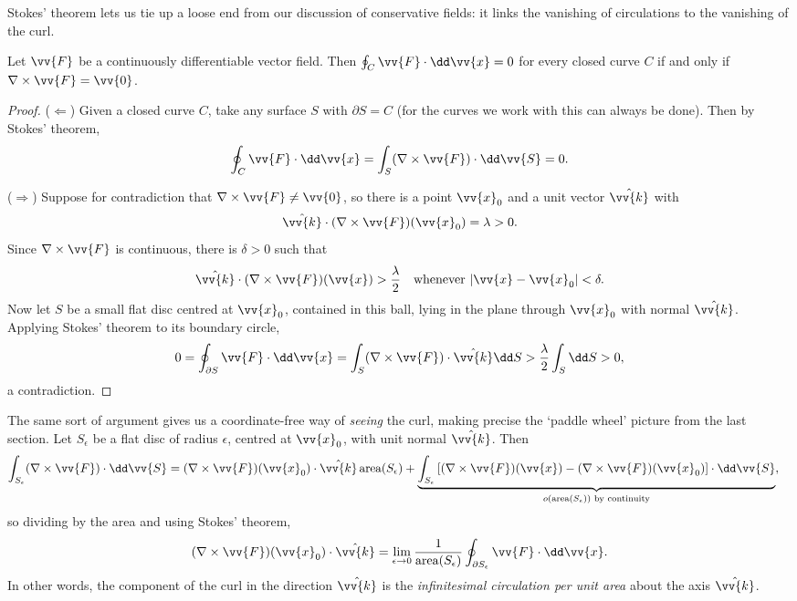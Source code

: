 Stokes' theorem lets us tie up a loose end from our discussion of conservative fields: it links the vanishing of circulations to the vanishing of the curl.

\begin{proposition}
	Let $\vv{F}$ be a continuously differentiable vector field. Then $\oint_C \vv{F} \cdot \dd \vv{x} = 0$ for every closed curve $C$ if and only if $\nabla \times \vv{F} = \vv{0}$.
\end{proposition}
\begin{proof}
	($\Leftarrow$) Given a closed curve $C$, take any surface $S$ with $\partial S = C$ (for the curves we work with this can always be done). Then by Stokes' theorem,
	$$
	\oint_C \vv{F} \cdot \dd \vv{x} = \int_S (\nabla \times \vv{F}) \cdot \dd \vv{S} = 0.
	$$

	($\Rightarrow$) Suppose for contradiction that $\nabla \times \vv{F} \neq \vv{0}$, so there is a point $\vv{x}_0$ and a unit vector $\hat{\vv{k}}$ with
	$$
	\hat{\vv{k}} \cdot (\nabla \times \vv{F})(\vv{x}_0) = \lambda > 0.
	$$
	Since $\nabla \times \vv{F}$ is continuous, there is $\delta > 0$ such that
	$$
	\hat{\vv{k}} \cdot (\nabla \times \vv{F})(\vv{x}) > \frac{\lambda}{2} \quad \text{whenever } |\vv{x} - \vv{x}_0| < \delta.
	$$
	Now let $S$ be a small flat disc centred at $\vv{x}_0$, contained in this ball, lying in the plane through $\vv{x}_0$ with normal $\hat{\vv{k}}$. Applying Stokes' theorem to its boundary circle,
	$$
	0 = \oint_{\partial S} \vv{F} \cdot \dd \vv{x} = \int_S (\nabla \times \vv{F}) \cdot \hat{\vv{k}} \dd S > \frac{\lambda}{2} \int_S \dd S > 0,
	$$
	a contradiction.
\end{proof}

The same sort of argument gives us a coordinate-free way of \emph{seeing} the curl, making precise the `paddle wheel' picture from the last section. Let $S_\epsilon$ be a flat disc of radius $\epsilon$, centred at $\vv{x}_0$, with unit normal $\hat{\vv{k}}$. Then
\begin{align*}
	\int_{S_\epsilon} (\nabla \times \vv{F}) \cdot \dd \vv{S} &= (\nabla \times \vv{F})(\vv{x}_0) \cdot \hat{\vv{k}} \, \text{area}(S_\epsilon) + \underbrace{\int_{S_\epsilon} \left[(\nabla \times \vv{F})(\vv{x}) - (\nabla \times \vv{F})(\vv{x}_0)\right] \cdot \dd \vv{S}}_{o(\text{area}(S_\epsilon)) \text{ by continuity}},
\end{align*}
so dividing by the area and using Stokes' theorem,
$$
(\nabla \times \vv{F})(\vv{x}_0) \cdot \hat{\vv{k}} = \lim_{\epsilon \to 0} \frac{1}{\text{area}(S_\epsilon)} \oint_{\partial S_\epsilon} \vv{F} \cdot \dd \vv{x}.
$$
In other words, the component of the curl in the direction $\hat{\vv{k}}$ is the \emph{infinitesimal circulation per unit area} about the axis $\hat{\vv{k}}$.

